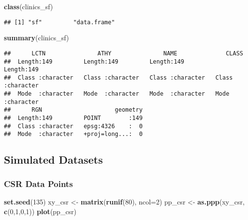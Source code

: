 \documentclass[
]{book}
\newenvironment{Shaded}{\begin{snugshade}}{\end{snugshade}}
\newcommand{\DataTypeTok}[1]{\textcolor[rgb]{0.13,0.29,0.53}{#1}}
\newcommand{\DecValTok}[1]{\textcolor[rgb]{0.00,0.00,0.81}{#1}}
\newcommand{\KeywordTok}[1]{\textcolor[rgb]{0.13,0.29,0.53}{\textbf{#1}}}
\newcommand{\NormalTok}[1]{#1}
\newcommand{\StringTok}[1]{\textcolor[rgb]{0.31,0.60,0.02}{#1}}
\begin{document}
\begin{Shaded}
\begin{Highlighting}[]
\KeywordTok{class}\NormalTok{(clinics_sf)}
\end{Highlighting}
\end{Shaded}

\begin{verbatim}
## [1] "sf"         "data.frame"
\end{verbatim}

\begin{Shaded}
\begin{Highlighting}[]
\KeywordTok{summary}\NormalTok{(clinics_sf)}
\end{Highlighting}
\end{Shaded}

\begin{verbatim}
##      LCTN               ATHY               NAME              CLASS          
##  Length:149         Length:149         Length:149         Length:149        
##  Class :character   Class :character   Class :character   Class :character  
##  Mode  :character   Mode  :character   Mode  :character   Mode  :character  
##      RGN                     geometry  
##  Length:149         POINT        :149  
##  Class :character   epsg:4326    :  0  
##  Mode  :character   +proj=long...:  0
\end{verbatim}

\hypertarget{simulated-datasets}{%
\subsection{Simulated Datasets}\label{simulated-datasets}}

\hypertarget{csr-data-points}{%
\subsubsection{CSR Data Points}\label{csr-data-points}}

\begin{Shaded}
\begin{Highlighting}[]
\KeywordTok{set.seed}\NormalTok{(}\DecValTok{135}\NormalTok{)}
\NormalTok{xy_csr <-}\StringTok{ }\KeywordTok{matrix}\NormalTok{(}\KeywordTok{runif}\NormalTok{(}\DecValTok{80}\NormalTok{), }\DataTypeTok{ncol=}\DecValTok{2}\NormalTok{)}
\NormalTok{pp_csr <-}\StringTok{ }\KeywordTok{as.ppp}\NormalTok{(xy_csr, }\KeywordTok{c}\NormalTok{(}\DecValTok{0}\NormalTok{,}\DecValTok{1}\NormalTok{,}\DecValTok{0}\NormalTok{,}\DecValTok{1}\NormalTok{))}
\KeywordTok{plot}\NormalTok{(pp_csr)}
\end{Highlighting}
\end{Shaded}
\end{document}
